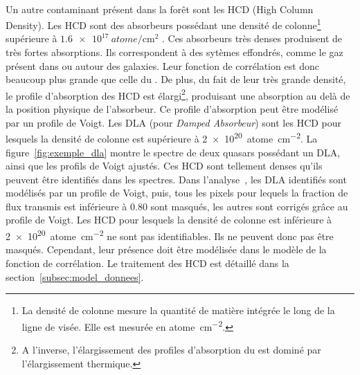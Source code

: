 \paragraph{}
Un autre contaminant présent dans la forêt \lya{} sont les HCD (High Column Density). Les HCD sont des absorbeurs possédant une densité de colonne\footnote{La densité de colonne mesure la quantité de matière intégrée le long de la ligne de visée. Elle est mesurée en \si{atome\per\centi\meter\squared}.} supérieure à $\SI{1.6e17}{atome\per\centi\meter\squared}$ \autocite{Rogers2017}. Ces absorbeurs très denses produisent de très fortes absorptions. Ils correspondent à des sytèmes effondrés, comme le gaz présent dans ou autour des galaxies. Leur fonction de corrélation est donc beaucoup plus grande que celle du \lya{}.
De plus, du fait de leur très grande densité, le profile d'absorption des HCD est élargi\footnote{A l'inverse, l'élargissement des profiles d'absorption du \lya{} est dominé par l'élargissement thermique.}, produisant une absorption au delà de la position physique de l'absorbeur. 
Ce profile d'absorption peut être modélisé par un profile de Voigt.
Les DLA (pour \emph{Damped \lya{} Absorbeur}) sont les HCD pour lesquels la densité de colonne est supérieure à \SI{2e20}{atome\per\centi\meter\squared}.
La figure~\ref{fig:exemple_dla} montre le spectre de deux quasars possédant un DLA, ainsi que les profils de Voigt ajustés.
Ces HCD sont tellement denses qu'ils peuvent être identifiés dans les spectres. Dans l'analyse~\cite{DuMasdesBourboux2020}, les DLA identifiés sont modélisés par un profile de Voigt, puis, tous les pixels pour lequels la fraction de flux transmis est inférieure à \num{0.80} sont masqués, les autres sont corrigés grâce au profile de Voigt.
Les HCD pour lesquels la densité de colonne est inférieure à \SI{2e20}{atome\per\centi\meter\squared} ne sont pas identifiables. Ils ne peuvent donc pas être masqués.
Cependant, leur présence doit être modélisée dans le modèle de la fonction de corrélation.
Le traitement des HCD est détaillé dans la section~\ref{subsec:model_donnees}.
